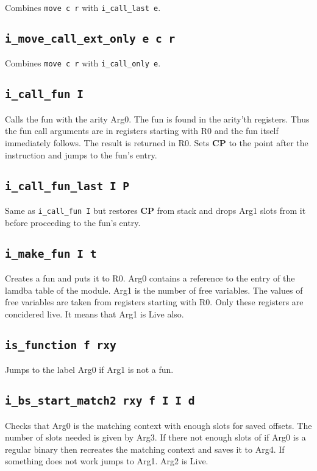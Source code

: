 \documentclass{article}
\newcommand{\cp}{\textbf{CP}}
\newcommand{\iop}[1]{\texttt{#1}}
\begin{document}
Combines \iop{move c r} with \iop{i\_call\_last e}.

\subsection*{\iop{i\_move\_call\_ext\_only e c r}}

Combines \iop{move c r} with \iop{i\_call\_only e}.

\subsection*{\iop{i\_call\_fun I}}

Calls the fun with the arity Arg0. The fun is found in the arity'th registers.
Thus the fun call arguments are in registers starting with R0 and the fun itself
immediately follows. The result is returned in R0. Sets \cp{} to the point after
the instruction and jumps to the fun's entry.

\subsection*{\iop{i\_call\_fun\_last I P}}

Same as \iop{i\_call\_fun I} but restores \cp{} from stack and drops Arg1 slots
from it before proceeding to the fun's entry.

\subsection*{\iop{i\_make\_fun I t}}

Creates a fun and puts it to R0. Arg0 contains a reference to the entry of the
lamdba table of the module. Arg1 is the number of free variables. The values of
free variables are taken from registers starting with R0. Only these registers
are concidered live. It means that Arg1 is Live also.

\subsection*{\iop{is\_function f rxy}}

Jumps to the label Arg0 if Arg1 is not a fun.

\subsection*{\iop{i\_bs\_start\_match2 rxy f I I d}}

Checks that Arg0 is the matching context with enough slots for saved offsets.
The number of slots needed is given by Arg3. If there not enough slots of if
Arg0 is a regular binary then recreates the matching context and saves it to
Arg4. If something does not work jumps to Arg1. Arg2 is Live.
\end{document}
